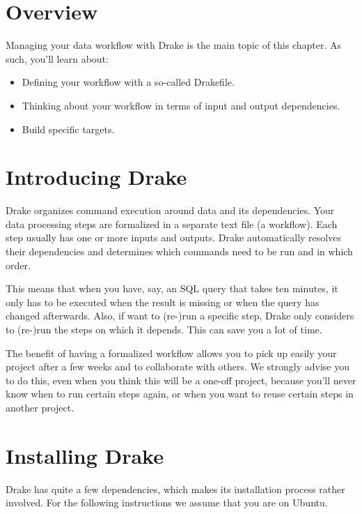 \documentclass[
]{book}
\providecommand{\tightlist}{%
  \setlength{\itemsep}{0pt}\setlength{\parskip}{0pt}}
\theoremstyle{definition}
\theoremstyle{definition}
\theoremstyle{definition}
\theoremstyle{remark}
\begin{document}
\hypertarget{overview}{%
\section{Overview}\label{overview}}

Managing your data workflow with Drake is the main topic of this chapter. As such, you'll learn about:

\begin{itemize}
\tightlist
\item
  Defining your workflow with a so-called Drakefile.
\item
  Thinking about your workflow in terms of input and output dependencies.
\item
  Build specific targets.
\end{itemize}

\hypertarget{introducing-drake}{%
\section{Introducing Drake}\label{introducing-drake}}

Drake organizes command execution around data and its dependencies. Your data processing steps are formalized in a separate text file (a workflow). Each step usually has one or more inputs and outputs. Drake automatically resolves their dependencies and determines which commands need to be run and in which order.

This means that when you have, say, an SQL query that takes ten minutes, it only has to be executed when the result is missing or when the query has changed afterwards. Also, if want to (re-)run a specific step, Drake only considers to (re-)run the steps on which it depends. This can save you a lot of time.

The benefit of having a formalized workflow allows you to pick up easily your project after a few weeks and to collaborate with others. We strongly advise you to do this, even when you think this will be a one-off project, because you'll never know when to run certain steps again, or when you want to reuse certain steps in another project.

\hypertarget{installing-drake}{%
\section{Installing Drake}\label{installing-drake}}

Drake has quite a few dependencies, which makes its installation process rather involved. For the following instructions we assume that you are on Ubuntu.
\end{document}
